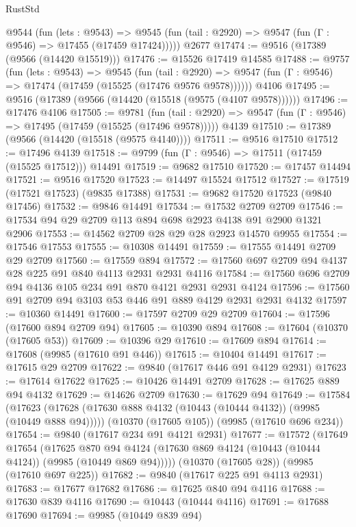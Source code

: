 \begin{lexlean}{RustStd}
\begin{coremodule}
    @9544
      (fun (lets : @9543) =>
      @9545 (fun (tail : @2920) => @9547 (fun (Γ : @9546) => @17455 (@17459 @17424)))))
    @2677
@17474 := @9516 (@17389 (@9566 (@14420 @15519)))
@17476 := @15526 @17419 @14585
@17488 := @9757
    (fun (lets : @9543) =>
    @9545
      (fun (tail : @2920) =>
      @9547 (fun (Γ : @9546) => @17474 (@17459 (@15525 (@17476 @9576 @9578))))))
    @4106
@17495 := @9516 (@17389 (@9566 (@14420 (@15518 (@9575 (@4107 @9578))))))
@17496 := @17476 @4106
@17505 := @9781
    (fun (tail : @2920) => @9547 (fun (Γ : @9546) => @17495 (@17459 (@15525 (@17496 @9578)))))
    @4139
@17510 := @17389 (@9566 (@14420 (@15518 (@9575 @4140))))
@17511 := @9516 @17510
@17512 := @17496 @4139
@17518 := @9799 (fun (Γ : @9546) => @17511 (@17459 (@15525 @17512))) @14491
@17519 := @9682 @17510
@17520 := @17457 @14494
@17521 := @9516 @17520
@17523 := @14497 @15524 @17512
@17527 := @17519 (@17521 @17523) (@9835 @17388)
@17531 := @9682 @17520 @17523 (@9840 @17456)
@17532 := @9846 @14491
@17534 := @17532 @2709 @2709
@17546 := @17534 @94 @29 @2709 @113 @894 @698 @2923 @4138 @91 @2900 @1321 @2906
@17553 := @14562 @2709 @28 @29 @28 @2923 @14570 @9955
@17554 := @17546 @17553
@17555 := @10308 @14491
@17559 := @17555 @14491 @2709 @29 @2709
@17560 := @17559 @894
@17572 := @17560 @697 @2709 @94 @4137 @28 @225 @91 @840 @4113 @2931 @2931 @4116
@17584 := @17560 @696 @2709 @94 @4136 @105 @234 @91 @870 @4121 @2931 @2931 @4124
@17596 := @17560 @91 @2709 @94 @3103 @53 @446 @91 @889 @4129 @2931 @2931 @4132
@17597 := @10360 @14491
@17600 := @17597 @2709 @29 @2709
@17604 := @17596 (@17600 @894 @2709 @94)
@17605 := @10390 @894
@17608 := @17604 (@10370 (@17605 @53))
@17609 := @10396 @29
@17610 := @17609 @894
@17614 := @17608 (@9985 (@17610 @91 @446))
@17615 := @10404 @14491
@17617 := @17615 @29 @2709
@17622 := @9840 (@17617 @446 @91 @4129 @2931)
@17623 := @17614 @17622
@17625 := @10426 @14491 @2709
@17628 := @17625 @889 @94 @4132
@17629 := @14626 @2709
@17630 := @17629 @94
@17649 := @17584
    (@17623 (@17628 (@17630 @888 @4132 (@10443 (@10444 @4132)) (@9985 (@10449 @888 @94)))))
    (@10370 (@17605 @105))
    (@9985 (@17610 @696 @234))
@17654 := @9840 (@17617 @234 @91 @4121 @2931)
@17677 := @17572
    (@17649
      @17654
      (@17625 @870 @94 @4124 (@17630 @869 @4124 (@10443 (@10444 @4124)) (@9985 (@10449 @869 @94)))))
    (@10370 (@17605 @28))
    (@9985 (@17610 @697 @225))
@17682 := @9840 (@17617 @225 @91 @4113 @2931)
@17683 := @17677 @17682
@17686 := @17625 @840 @94 @4116
@17688 := @17630 @839 @4116
@17690 := @10443 (@10444 @4116)
@17691 := @17688 @17690
@17694 := @9985 (@10449 @839 @94)

\end{coremodule}
\end{lexlean}

